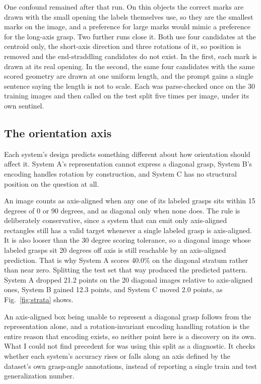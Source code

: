\documentclass[12pt,letterpaper]{article}
\begin{document}
One confound remained after that run. On thin objects the correct
marks are drawn with the small opening the labels themselves use, so
they are the smallest marks on the image, and a preference for large
marks would mimic a preference for the long-axis grasp. Two further
runs close it. Both use four candidates at the centroid only, the
short-axis direction and three rotations of it, so position is removed
and the end-straddling candidates do not exist. In the first, each mark
is drawn at its real opening. In the second, the same four candidates
with the same scored geometry are drawn at one uniform length, and the
prompt gains a single sentence saying the length is not to scale. Each
was parse-checked once on the 30 training images and then called on
the test split five times per image, under its own sentinel.

\subsection{The orientation axis}

Each system's design predicts something different about how orientation
should affect it. System A's representation cannot express a diagonal
grasp, System B's encoding handles rotation by construction, and System
C has no structural position on the question at all.

An image counts as axis-aligned when any one of its labeled grasps sits
within 15 degrees of 0 or 90 degrees, and as diagonal only when none
does. The rule is deliberately conservative, since a system that can
emit only axis-aligned rectangles still has a valid target whenever a
single labeled grasp is axis-aligned. It is also looser than the 30
degree scoring tolerance, so a diagonal image whose labeled grasps sit
20 degrees off axis is still reachable by an axis-aligned prediction.
That is why System A scores 40.0\% on the diagonal stratum rather than
near zero. Splitting the test set that way
produced the predicted pattern. System A dropped 21.2 points on
the 20 diagonal images relative to axis-aligned ones, System B gained
12.3 points, and System C moved 2.0 points, as Fig.~\ref{fig:strata}
shows.

An axis-aligned box being unable to represent a diagonal grasp follows
from the representation alone, and a rotation-invariant encoding
handling rotation is the entire reason that encoding exists, so neither
point here is a discovery on its own. What I could not find precedent
for was using this split as a diagnostic. It checks whether each
system's accuracy rises or falls along an axis defined by the dataset's
own grasp-angle annotations, instead of reporting a single train and
test generalization number.
\end{document}
